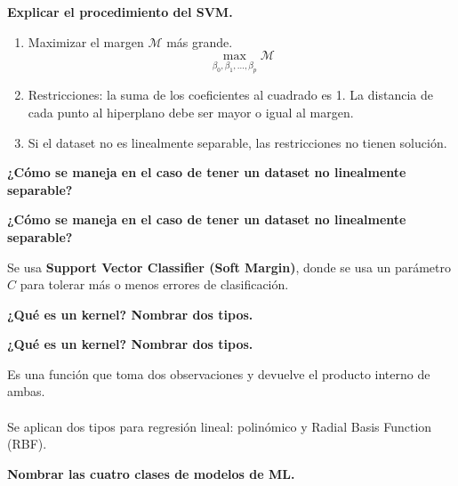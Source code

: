 \documentclass[10pt]{memoir}
\begin{document}
\clearpage
\begin{center}
	\textbf{\Large Explicar el procedimiento del SVM.} \\
\end{center}
\begin{enumerate}
	\item Maximizar el margen \(\mathcal{M}\) más grande. \[\max_{\beta_{0}, \beta_{1}, ..., \beta_{p}} \mathcal M\]
	\item Restricciones: la suma de los coeficientes al cuadrado es 1. La distancia de cada punto al hiperplano debe ser mayor o igual al margen.
	\item Si el dataset no es linealmente separable, las restricciones no tienen solución.
\end{enumerate}

\clearpage
\begin{center}
	\textbf{\Large ¿Cómo se maneja en el caso de tener un dataset no linealmente separable?} \\
\end{center}

\clearpage
\begin{center}
	\textbf{\Large ¿Cómo se maneja en el caso de tener un dataset no linealmente separable?} \\
\end{center}
\noindent Se usa \textbf{Support Vector Classifier (Soft Margin)}, donde se usa un parámetro $C$ para tolerar más o menos errores de clasificación.

\clearpage
\begin{center}
	\textbf{\Large ¿Qué es un kernel? Nombrar dos tipos.} \\
\end{center}

\clearpage
\begin{center}
	\textbf{\Large ¿Qué es un kernel? Nombrar dos tipos.} \\
\end{center}
\noindent Es una función que toma dos observaciones y devuelve el producto interno de ambas. \\
\\
\noindent Se aplican dos tipos para regresión lineal: polinómico y Radial Basis Function (RBF).


\clearpage
\begin{center}
	\textbf{\Large Nombrar las cuatro clases de modelos de ML.} \\
\end{center}
\end{document}
